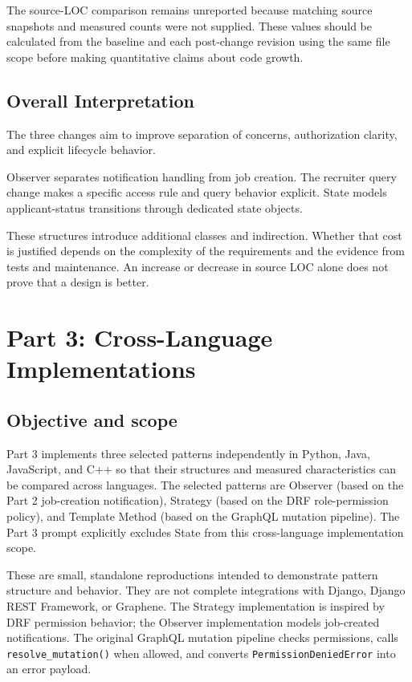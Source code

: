 \documentclass[11pt,a4paper]{article}
\newcommand{\code}[1]{\texttt{#1}}
\begin{document}
The source-LOC comparison remains unreported because matching source
snapshots and measured counts were not supplied. These values should be
calculated from the baseline and each post-change revision using the same
file scope before making quantitative claims about code growth.

\subsection{Overall Interpretation}

The three changes aim to improve separation of concerns,
authorization clarity, and explicit lifecycle behavior.

Observer separates notification handling from job creation.
The recruiter query change makes a specific access rule and
query behavior explicit. State models applicant-status
transitions through dedicated state objects.

These structures introduce additional classes and indirection.
Whether that cost is justified depends on the complexity of
the requirements and the evidence from tests and maintenance.
An increase or decrease in source LOC alone does not prove
that a design is better.



\section{Part 3: Cross-Language Implementations}

\subsection{Objective and scope}

Part 3 implements three selected patterns independently in Python, Java,
JavaScript, and C++ so that their structures and measured characteristics
can be compared across languages. The selected patterns are Observer
(based on the Part 2 job-creation notification), Strategy (based on the
DRF role-permission policy), and Template Method (based on the GraphQL
mutation pipeline). The Part 3 prompt explicitly excludes State from this
cross-language implementation scope.

These are small, standalone reproductions intended to demonstrate pattern
structure and behavior. They are not complete integrations with Django,
Django REST Framework, or Graphene. The Strategy implementation is inspired
by DRF permission behavior; the Observer implementation models job-created
notifications. The original GraphQL mutation pipeline checks permissions,
calls \code{resolve\_mutation()} when allowed, and converts
\code{PermissionDeniedError} into an error payload.
\end{document}
